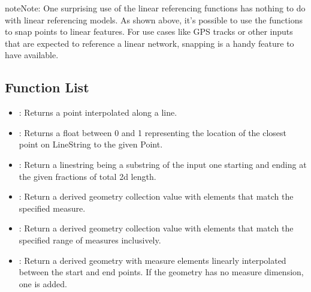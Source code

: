 \documentclass[a4paper,11pt,english]{sphinxmanual}
\begin{document}
\noindent{}

\begin{sphinxadmonition}{note}{Note:}
One surprising use of the linear referencing functions has nothing to do with linear referencing models. As shown above, it’s possible to use the functions to snap points to linear features. For use cases like GPS tracks or other inputs that are expected to reference a linear network, snapping is a handy feature to have available.
\end{sphinxadmonition}


\subsection{Function List}
\label{\detokenize{advanced:function-list}}\begin{itemize}
\item {} 
: Returns a point interpolated along a line.

\item {} 
: Returns a float between 0 and 1 representing the location of the closest point on LineString to the given Point.

\item {} 
: Return a linestring being a substring of the input one starting and ending at the given fractions of total 2d length.

\item {} 
: Return a derived geometry collection value with elements that match the specified measure.

\item {} 
: Return a derived geometry collection value with elements that match the specified range of measures inclusively.

\item {} 
: Return a derived geometry with measure elements linearly interpolated between the start and end points. If the geometry has no measure dimension, one is added.

\end{itemize}
\end{document}
